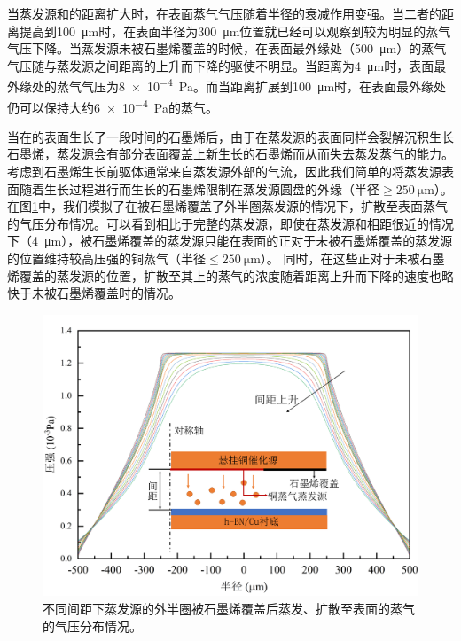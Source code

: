     当蒸发源和的距离扩大时，在表面蒸气气压随着半径的衰减作用变强。当二者的距离提高到\SI{100}{\micro\meter}时，在表面半径为\SI{300}{\micro\meter}位置就已经可以观察到较为明显的蒸气气压下降。当蒸发源未被石墨烯覆盖的时候，在表面最外缘处（\SI{500}{\micro\meter}）的蒸气气压随与蒸发源之间距离的上升而下降的驱使不明显。当距离为\SI{4}{\micro\meter}时，表面最外缘处的蒸气气压为\SI{8e-4}{\pascal}。而当距离扩展到\SI{100}{\micro\meter}时，在表面最外缘处仍可以保持大约\SI{6e-4}{\pascal}的蒸气。

    当在的表面生长了一段时间的石墨烯后，由于在蒸发源的表面同样会裂解沉积生长石墨烯，蒸发源会有部分表面覆盖上新生长的石墨烯而从而失去蒸发蒸气的能力。考虑到石墨烯生长前驱体通常来自蒸发源外部的气流，因此我们简单的将蒸发源表面随着生长过程进行而生长的石墨烯限制在蒸发源圆盘的外缘（半径$\geqslant \SI{250}{\micro\meter}$）。在图\ref{fig:CG_FEM_halfCu}中，我们模拟了在被石墨烯覆盖了外半圈蒸发源的情况下，扩散至表面蒸气的气压分布情况。可以看到相比于完整的蒸发源，即使在蒸发源和相距很近的情况下（\SI{4}{\micro\meter}），被石墨烯覆盖的蒸发源只能在表面的正对于未被石墨烯覆盖的蒸发源的位置维持较高压强的铜蒸气（半径$\leqslant \SI{250}{\micro\meter}$）。
    同时，在这些正对于未被石墨烯覆盖的蒸发源的位置，扩散至其上的蒸气的浓度随着距离上升而下降的速度也略快于未被石墨烯覆盖时的情况。

    \begin{figure}[htb]
        \includegraphics{pic/CG_FEM_halfCu.png}
        \caption{不同间距下蒸发源的外半圈被石墨烯覆盖后蒸发、扩散至表面的蒸气的气压分布情况。}
        \label{fig:CG_FEM_halfCu}
    \end{figure}

